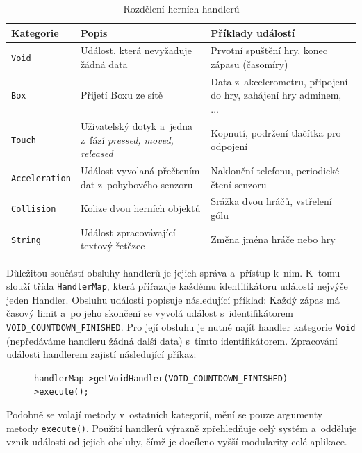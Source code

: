 \documentclass[thesis=B,czech,hidelinks]{FITthesis}[2012/06/26] %
\newcommand{\code}[1]{\texttt{#1}}
\begin{document}
\begin{table}[h]
\caption{Rozdělení herních handlerů}
\label{table:handlers}
\begin{tabularx}{\textwidth}{|X|X|X|}
\hline
\textbf{Kategorie} & \textbf{Popis} & \textbf{Příklady událostí} \\ \hline
\code{Void} & Událost, která nevyžaduje žádná data & Prvotní spuštění hry, konec zápasu (časomíry) \\ \hline
\code{Box} & Přijetí Boxu ze sítě & Data z~akcelerometru, připojení do hry, zahájení hry adminem, ... \\ \hline
\code{Touch} & Uživatelský dotyk a~jedna z~fází \textit{pressed, moved, released} & Kopnutí, podržení tlačítka pro odpojení \\ \hline
\code{Acceleration} & Událost vyvolaná přečtením dat z~pohybového senzoru & Naklonění telefonu, periodické čtení senzoru \\ \hline
\code{Collision} & Kolize dvou herních objektů & Srážka dvou hráčů, vstřelení gólu\\ \hline
\code{String} & Událost zpracovávající textový řetězec & Změna jména hráče nebo hry \\ \hline

\end{tabularx}
\end{table}

Důležitou součástí obsluhy handlerů je jejich správa a~přístup k~nim. K~tomu slouží třída \code{HandlerMap}, která přiřazuje každému identifikátoru události nejvýše jeden Handler. Obsluhu události popisuje následující příklad: Každý zápas má časový limit a~po jeho skončení se vyvolá událost s~identifikátorem \code{VOID\_COUNTDOWN\_FINISHED}. Pro její obsluhu je nutné najít handler kategorie \code{Void} (nepředáváme handleru žádná další data) s~tímto identifikátorem. Zpracování události handlerem zajistí následující příkaz: 

\begin{figure}[h!]
	\code{handlerMap->getVoidHandler(VOID\_COUNTDOWN\_FINISHED)->execute();}
\end{figure}

Podobně se volají metody v~ostatních kategorií, mění se pouze argumenty metody \code{execute()}. Použití handlerů výrazně zpřehledňuje celý systém a~odděluje vznik události od jejich obsluhy, čímž je docíleno vyšší modularity celé aplikace.
\end{document}
